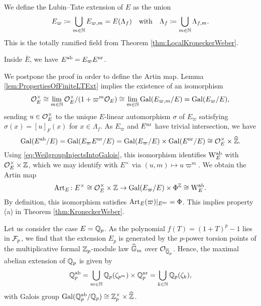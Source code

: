 \documentclass[../main.tex]{subfiles}
\begin{document}
We define the Lubin--Tate extension of $E$ as the union
\begin{equation*}
  E_\varpi \coloneq \bigcup_{m \in \mathbb{N}} E_{\varpi, m} = E(\Lambda_f) \quad
  \text{with} \quad \Lambda_f \coloneqq \bigcup_{m \in \mathbb{N}} \Lambda_{f,m}.
\end{equation*}
This is the totally ramified field from Theorem \ref{thm:LocalKroneckerWeber}.
\begin{thm}\label{thm:LocalKW}
  Inside $\bar E$, we have $E^{\mathrm{ab}} = E_\varpi E^{\mathrm{nr}}$.
\end{thm}
We postpone the proof in order to define the Artin map. Lemma
\ref{lem:PropertiesOfFiniteLTExt} implies the existence of an isomorphism
\begin{equation*}
  \mathcal{O}_E^\times \cong \lim_{m \in \mathbb{N}} \mathcal{O}_E^\times/(1 + \varpi^m \mathcal{O}_E) \cong
  \lim_{m \in \mathbb{N}} \operatorname{Gal}(E_{\varpi,m}/E) = \operatorname{Gal}(E_\varpi/E),
\end{equation*}
sending $u \in \mathcal{O}_E^\times$ to the unique $E$-linear automorphism $\sigma$ of
$E_\varpi$ satisfying $\sigma(x) = [u]_F(x)$ for $x \in \Lambda_f$. 
As $E_\varpi$ and $E^{\mathrm{nr}}$ have trivial intersection, we have
\begin{equation*}
  \operatorname{Gal}(E^{\mathrm{ab}} /E) = \operatorname{Gal}(E_\varpi E^{\mathrm{nr}} / E) = \operatorname{Gal}(E_\varpi/E) \times
  \operatorname{Gal}(E^{\mathrm{nr}} /E) \cong \mathcal{O}_E^\times \times \widehat {\mathbb{Z}}.
\end{equation*}
Using \eqref{eq:WeilgroupInjectsIntoGalois}, this isomorphism
identifies $\mathrm W_E^{\mathrm{ab}}$ with $\mathcal{O}_E^\times \times \mathbb{Z}$, which we may identify 
with $E^\times$ via $(u, m) \mapsto u \varpi^m$. We obtain the Artin map
\begin{equation*}
  \operatorname{Art}_E\colon E^\times \cong \mathcal{O}_E^\times \times \mathbb{Z} \to 
  \operatorname{Gal}(E_\varpi/E) \times \Phi^{\mathbb{Z}} \cong \mathrm W_E^{\mathrm{ab}}.
\end{equation*}
By definition, this isomorphism satisfies 
$\operatorname{Art}_E(\varpi)|_{E^{\mathrm{nr}}} = \Phi$. This implies property (a) in 
Theorem \ref{thm:KroneckerWeber}. 

\begin{xpl}
  Let us consider the case $E = \mathbb{Q}_p$. As the polynomial 
  $f(T) = (1+T)^p - 1$ lies in $\mathcal{F}_p$, we find that the extension $E_p$ is generated
  by the $p$-power torsion points of the multiplicative formal $\mathbb{Z}_p$-module law
  $\widehat{\mathbb{G}}_m$ over $\mathcal{O}_{\overline {\mathbb{Q}}_p}$.
  Hence, the maximal abelian extension of $\mathbb{Q}_p$ is given by 
  \begin{equation*}
    \mathbb{Q}_p^{\mathrm{ab}} = \bigcup_{m \in \mathbb{N}} \mathbb{Q}_p(\zeta_{p^m}) \times \mathbb{Q}_p^{\mathrm{nr}}
             = \bigcup_{k \in \mathbb{N}} \mathbb{Q}_p(\zeta_k),
  \end{equation*}
  with Galois group $\operatorname{Gal}(\mathbb{Q}_p^{\mathrm{ab}} /\mathbb{Q}_p) \cong \mathbb{Z}_p^\times \times \widehat {\mathbb{Z}}$. 
\end{xpl}
\end{document}

